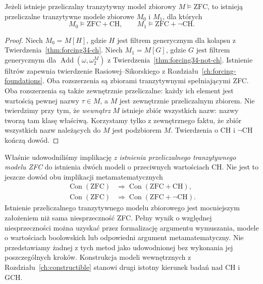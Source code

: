 \begin{twierdzenie}
\label{thm:forcing34-two-models}
Jeżeli istnieje przeliczalny
tranzytywny model zbiorowy
$M\models\mathrm{ZFC}$, to
istnieją przeliczalne tranzytywne
modele zbiorowe $M_0$ i $M_1$,
dla których
\[
 M_0\models\mathrm{ZFC}+\mathrm{CH},
 \qquad
 M_1\models\mathrm{ZFC}+\neg\mathrm{CH}.
\]
\end{twierdzenie}
\begin{proof}
Niech $M_0=M[H]$, gdzie
$H$ jest filtrem generycznym
dla kolapsu z
Twierdzenia~\ref{thm:forcing34-ch}.
Niech $M_1=M[G]$, gdzie
$G$ jest filtrem generycznym
dla $\operatorname{Add}(\omega,\omega_2^M)$
z Twierdzenia~\ref{thm:forcing34-not-ch}.
Istnienie filtrów zapewnia
twierdzenie Rasiowej--Sikorskiego
z Rozdziału~\ref{ch:forcing-foundations}.
Oba rozszerzenia są zbiorami
tranzytywnymi spełniającymi ZFC.
Oba rozszerzenia są także zewnętrznie
przeliczalne: każdy ich element jest
wartością pewnej nazwy $\tau\in M$,
a $M$ jest zewnętrznie przeliczalnym
zbiorem. Nie twierdzimy przy tym,
że \emph{wewnątrz} $M$ istnieje
zbiór wszystkich nazw:
nazwy tworzą tam klasę właściwą.
Korzystamy tylko z zewnętrznego
faktu, że zbiór wszystkich nazw
należących do $M$ jest podzbiorem $M$.
Twierdzenia o CH i $\neg\mathrm{CH}$
kończą dowód.
\end{proof}

\begin{uwaga}
\label{rem:forcing34-consistency}
Właśnie udowodniliśmy implikację
\emph{z istnienia przeliczalnego
tranzytywnego modelu ZFC} do istnienia
dwóch modeli o przeciwnych wartościach
CH. Nie jest to jeszcze dowód obu
implikacji metamatematycznych
\[
\begin{aligned}
 \operatorname{Con}(\mathrm{ZFC})
  &\Longrightarrow
       \operatorname{Con}(\mathrm{ZFC}+\mathrm{CH}),\\
 \operatorname{Con}(\mathrm{ZFC})
  &\Longrightarrow
       \operatorname{Con}(\mathrm{ZFC}+\neg\mathrm{CH}).
\end{aligned}
\]
Istnienie przeliczalnego
tranzytywnego modelu zbiorowego
jest mocniejszym założeniem niż
sama niesprzeczność ZFC.
Pełny wynik o względnej
niesprzeczności można uzyskać
przez formalizację argumentu
wymuszania, modele o wartościach
boolowskich lub odpowiedni
argument metamatematyczny.
Nie przedstawiamy żadnej z tych
metod jako udowodnionej bez
wykonania jej poszczególnych kroków.
Konstrukcja modeli wewnętrznych
z Rozdziału~\ref{ch:constructible}
stanowi drugi istotny kierunek
badań nad CH i GCH.
\end{uwaga}
